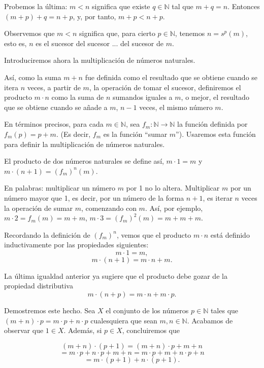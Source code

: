 Probemos la última: \(m < n\) significa que existe \(q \in \mathbb{N}\) tal que \(m + q = n\). Entonces \((m + p) + q = n + p\), y, por tanto, \(m + p < n + p\).

Observemos que \(m < n\) significa que, para cierto \(p \in \mathbb{N}\), tenemos \(n = s^p(m)\), esto es, \(n\) es el sucesor del sucesor ... del sucesor de \(m\).

Introduciremos ahora la multiplicación de números naturales.

Así, como la suma \(m + n\) fue definida como el resultado que se obtiene cuando se itera \(n\) veces, a partir de \(m\), la operación de tomar el sucesor, definiremos el producto \(m \cdot n\) como la suma de \(n\) sumandos iguales a \(m\), o mejor, el resultado que se obtiene cuando se añade a \(m\), \(n - 1\) veces, el mismo número \(m\).

En términos precisos, para cada \(m \in \mathbb{N}\), sea \(f_m: \mathbb{N} \to \mathbb{N}\) la función definida por \(f_m(p) = p + m\). (Es decir, \(f_m\) es la función “sumar \(m\)”). Usaremos esta función para definir la multiplicación de números naturales.

El producto de dos números naturales se define así, \(m \cdot 1 = m\) y \(m \cdot (n + 1) = (f_m)^n(m)\).

En palabras: multiplicar un número \(m\) por 1 no lo altera. Multiplicar \(m\) por un número mayor que 1, es decir, por un número de la forma \(n+1\), es iterar \(n\) veces la operación de sumar \(m\), comenzando con \(m\). Así, por ejemplo, \(m \cdot 2 = f_m(m) = m+m\), \(m \cdot 3 = (f_m)^2(m) = m + m + m\).

Recordando la definición de \((f_m)^n\), vemos que el producto \(m \cdot n\) está definido inductivamente por las propiedades siguientes:
\[
m \cdot 1 = m,
\]
\[
m \cdot (n + 1) = m \cdot n + m.
\]

La última igualdad anterior ya sugiere que el producto debe gozar de la propiedad distributiva
\[
m \cdot (n + p) = m \cdot n + m \cdot p.
\]

Demostremos este hecho. Sea \(X\) el conjunto de los números \(p \in \mathbb{N}\) tales que \((m + n) \cdot p = m \cdot p + n \cdot p\) cualesquiera que sean \(m, n \in \mathbb{N}\). Acabamos de observar que \(1 \in X\). Además, si \(p \in X\), concluiremos que

\[
(m + n) \cdot (p + 1) = (m + n) \cdot p + m + n
\]
\[
= m \cdot p + n \cdot p + m + n = m \cdot p + m + n \cdot p + n
\]
\[
= m \cdot (p + 1) + n \cdot (p + 1).
\]

